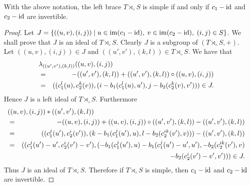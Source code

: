 \begin{theorem}\label{thm:simplebrace}
	With the above notation, the left brace $T\rtimes_{\circ}S$ is simple if and only if $c_1-\operatorname{id}$ and $c_2-\operatorname{id}$ are invertible. 
\end{theorem}  

\begin{proof}
	Let $J=\{((u,v),(i,j))\mid u\in\operatorname{im}(c_1-\operatorname{id}),\; v\in \operatorname{im}(c_2-\operatorname{id}), \; (i,j)\in S\}$. We shall prove that $J$ is an ideal of $T\rtimes_{\circ}S$. Clearly $J$ is a subgroup of $(T\rtimes_{\circ}S, +)$. Let $((u,v),(i,j))\in J$ and $((u',v'),(k,l))\in T\rtimes_{\circ}S$. We have that
	\begin{eqnarray*}
		\lefteqn{\lambda_{((u',v'),(k,l))}((u,v),(i,j))}\\
		&=&-((u',v'),(k,l))+((u',v'),(k,l))\circ ((u,v),(i,j))\\
		&=&((c_1^{l}(u),c_2^{k}(v)),(i-b_1(c_1^{l}(u),u'),j-b_2(c_2^{k}(v),v')))\in J.
	\end{eqnarray*}
Hence $J$ is a left ideal of $T\rtimes_{\circ}S$. Furthermore
\begin{eqnarray*}
	\lefteqn{((u,v),(i,j))*((u',v'),(k,l))}\\
	&=&-((u,v),(i,j))+((u,v),(i,j))\circ ((u',v'),(k,l))-((u',v'),(k,l))\\
	&=&((c_1^{j}(u'),c_2^{i}(v')),(k-b_1(c_1^{j}(u'),u),l-b_2(c_2^{ik}(v'),v)))-((u',v'),(k,l))\\
	&=&((c_1^{j}(u')-u',c_2^{i}(v')-v'),(-b_1(c_1^{j}(u'),u)-b_1(c_1^{j}(u')-u',u'),-b_2(c_2^{ik}(v'),v)\\
	&&\qquad\qquad -b_2(c_2^{i}(v')-v',v')))\in J.
\end{eqnarray*}	
Thus $J$ is an ideal of $T\rtimes_{\circ}S$. Therefore if $T\rtimes_{\circ}S$ is simple, then $c_1-\operatorname{id}$ and $c_2-\operatorname{id}$ are invertible.


\end{proof}
